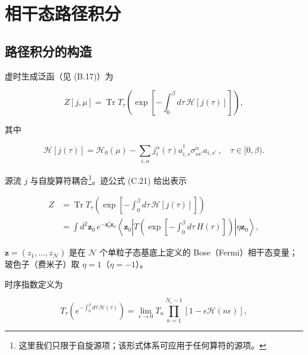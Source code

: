 \chapter{相干态路径积分}

\section{路径积分的构造}

虚时生成泛函（见 (B.17)）为

\begin{equation*}
Z [ j, \mu ] = \operatorname{Tr} T _ {\tau} \left( \exp \left[ - \int_ {0} ^ {\beta} d \tau \, \mathcal {H} [ j ( \tau ) ] \right] \right) ,
\tag{D.1}
\end{equation*}

其中

\begin{equation*}
\mathcal {H} [ j ( \tau ) ] = \mathcal {H} _ {0} ( \mu ) - \sum_{i, \alpha} j_{i} ^ {\alpha} ( \tau ) a_{i, s} ^ {\dagger} \sigma_{ss'} ^ {\alpha} a_{i, s '} \, , \quad \tau \in [ 0, \beta ).
\tag{D.2}
\end{equation*}

源流 $j$ 与自旋算符耦合\footnote{这里我们只限于自旋源项；该形式体系可应用于任何算符的源项。}。迹公式 (C.21) 给出表示

\begin{align*}
Z & = \operatorname{Tr} T _ {\tau} \left( \exp \left[ - \int_ {0} ^ {\beta} d \tau \, \mathcal {H} [ j ( \tau ) ] \right] \right)\\
& = \int d ^ {2} \mathbf {z} _ {0} \, e ^ {- \mathbf {z} _ {0} ^ {*} \mathbf {z} _ {0}} \left\langle \mathbf {z} _ {0} \left| T \left( \exp \left[ - \int_ {0} ^ {\beta} d \tau \, H ( \tau ) \right] \right) \right| \eta \mathbf {z} _ {0} \right\rangle ,
\tag{D.3}
\end{align*}

$\mathbf{z} = (z_{1},\ldots ,z_{\mathcal{N}})$ 是在 $\mathcal{N}$ 个单粒子态基底上定义的 Bose（Fermi）相干态变量；玻色子（费米子）取 $\eta = 1$（$\eta = -1$）。

时序指数定义为

\begin{equation*}
T _ {\tau} \left( e ^ {- \int_ {0} ^ {\beta} d \tau \, \mathcal {H} ( \tau )} \right) = \lim_{\epsilon \rightarrow 0} T_{n} \prod_{n = 1} ^ {N _ {\epsilon} - 1} \left[ 1 - \epsilon \mathcal {H} ( n \epsilon ) \right] ,
\tag{D.4}
\end{equation*}

